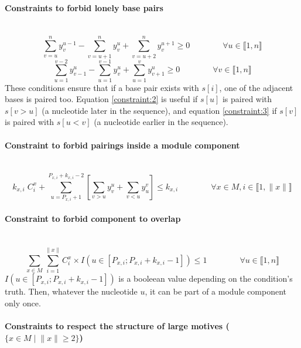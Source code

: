 \documentclass{article}
\begin{document}
\paragraph{Constraints to forbid lonely base pairs} ~
\begin{equation} \label{constraint:2}
	\sum_{v=u}^n y^{u-1}_v - \sum_{v=u+1}^n y^u_v + \sum_{v=u+2}^n y^{u+1}_v \geq 0 \qquad \qquad \forall u \in \llbracket 1,n\rrbracket
\end{equation}
\begin{equation} \label{constraint:3}
	\sum_{u=1}^{v-2} y^u_{v-1} - \sum_{u=1}^{v-1} y^u_v + \sum_{u=1}^{v} y^u_{v+1} \geq 0 \qquad \qquad \forall v \in \llbracket 1,n\rrbracket
\end{equation}
These conditions ensure that if a base pair exists with $s[i]$, 
one of the adjacent bases is paired too. 
Equation \ref{constraint:2} is useful if $s[u]$ is paired with $s[v>u]$ (a nucleotide later in the sequence), 
and equation \ref{constraint:3} if $s[v]$ is paired with $s[u<v]$ (a nucleotide earlier in the sequence).
	
\paragraph{Constraint to forbid pairings inside a module component} ~ 
\begin{equation} \label{constraint:4}
	k_{x,i} \; C^x_i + \sum_{u=P_{x,i}+1}^{P_{x,i}+k_{x,i}-2}\left[ \sum_{v>u} y^u_v + \sum_{v<u} y^v_u \right] \leq k_{x,i} 
	\qquad \qquad \forall x \in M, i \in \llbracket 1,\|x\| \rrbracket
\end{equation}
	
\paragraph{Constraint to forbid component to overlap} ~
\begin{equation} \label{constraint:5}
	\sum_{x \in M} \sum_{i=1}^{\|x\|} C^x_i \times I( u \in [ P_{x,i} ; P_{x,i}+k_{x,i}-1]) \leq 1 \qquad \qquad \forall u \in \llbracket 1,n \rrbracket
\end{equation}
$I( u \in [ P_{x,i} ; P_{x,i}+k_{x,i}-1])$ is a booleean value depending on the condition's truth. Then, whatever the nucleotide $u$, it can be part of a module component only once.
	
\paragraph{Constraints to respect the structure of large motives ($\{ x\in M \; | \; \|x\| \geq 2\}$)} ~ 
\end{document}
